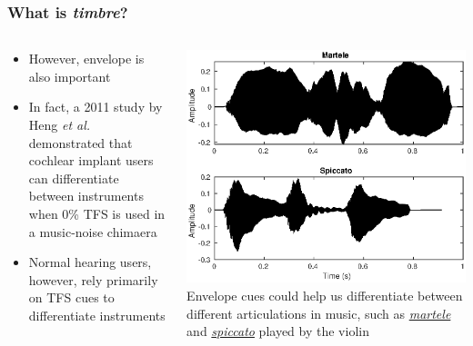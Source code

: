 \documentclass[aspectratio=1610]{beamer}
\begin{document}
\begin{frame}
\frametitle{What is \textit{timbre}?}

\begin{columns}
\begin{column}{0.4\textwidth}
\begin{itemize}[label = $\blacktriangleright$]
\item However, envelope is also important\vspace{.5em}
\item In fact, a 2011 study by Heng \textit{et al.} demonstrated that cochlear implant users can differentiate between instruments when 0\% TFS is used in a music-noise chimaera\vspace{.5em}
\item Normal hearing users, however, rely primarily on TFS cues to differentiate instruments
\end{itemize}
\end{column}
\begin{column}{0.6\textwidth}
\includegraphics[width = 1.0\textwidth]{mart_spic}
\centering
Envelope cues could help us differentiate between different articulations in music, such as \href{./Audio/martele.mp3}{\textit{martele}} and \href{./Audio/spiccato.mp3}{\textit{spiccato}} played by the violin
\end{column}
\end{columns}

\end{frame}
\end{document}
